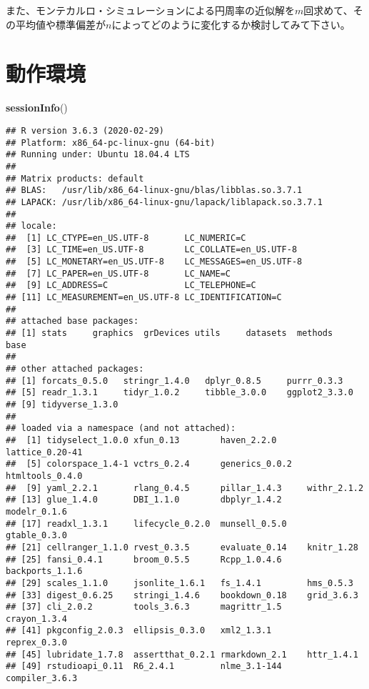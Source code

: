 \documentclass[]{bxjsarticle}
\newenvironment{Shaded}{\begin{snugshade}}{\end{snugshade}}
\newcommand{\KeywordTok}[1]{\textcolor[rgb]{0.13,0.29,0.53}{\textbf{#1}}}
\newcommand{\NormalTok}[1]{#1}
\begin{document}
また、モンテカルロ・シミュレーションによる円周率の近似解を\(m\)回求めて、その平均値や標準偏差が\(n\)によってどのように変化するか検討してみて下さい。

\hypertarget{environment}{%
\section*{動作環境}\label{environment}}

\begin{Shaded}
\begin{Highlighting}[]
\KeywordTok{sessionInfo}\NormalTok{()}
\end{Highlighting}
\end{Shaded}

\begin{verbatim}
## R version 3.6.3 (2020-02-29)
## Platform: x86_64-pc-linux-gnu (64-bit)
## Running under: Ubuntu 18.04.4 LTS
## 
## Matrix products: default
## BLAS:   /usr/lib/x86_64-linux-gnu/blas/libblas.so.3.7.1
## LAPACK: /usr/lib/x86_64-linux-gnu/lapack/liblapack.so.3.7.1
## 
## locale:
##  [1] LC_CTYPE=en_US.UTF-8       LC_NUMERIC=C              
##  [3] LC_TIME=en_US.UTF-8        LC_COLLATE=en_US.UTF-8    
##  [5] LC_MONETARY=en_US.UTF-8    LC_MESSAGES=en_US.UTF-8   
##  [7] LC_PAPER=en_US.UTF-8       LC_NAME=C                 
##  [9] LC_ADDRESS=C               LC_TELEPHONE=C            
## [11] LC_MEASUREMENT=en_US.UTF-8 LC_IDENTIFICATION=C       
## 
## attached base packages:
## [1] stats     graphics  grDevices utils     datasets  methods   base     
## 
## other attached packages:
## [1] forcats_0.5.0   stringr_1.4.0   dplyr_0.8.5     purrr_0.3.3    
## [5] readr_1.3.1     tidyr_1.0.2     tibble_3.0.0    ggplot2_3.3.0  
## [9] tidyverse_1.3.0
## 
## loaded via a namespace (and not attached):
##  [1] tidyselect_1.0.0 xfun_0.13        haven_2.2.0      lattice_0.20-41 
##  [5] colorspace_1.4-1 vctrs_0.2.4      generics_0.0.2   htmltools_0.4.0 
##  [9] yaml_2.2.1       rlang_0.4.5      pillar_1.4.3     withr_2.1.2     
## [13] glue_1.4.0       DBI_1.1.0        dbplyr_1.4.2     modelr_0.1.6    
## [17] readxl_1.3.1     lifecycle_0.2.0  munsell_0.5.0    gtable_0.3.0    
## [21] cellranger_1.1.0 rvest_0.3.5      evaluate_0.14    knitr_1.28      
## [25] fansi_0.4.1      broom_0.5.5      Rcpp_1.0.4.6     backports_1.1.6 
## [29] scales_1.1.0     jsonlite_1.6.1   fs_1.4.1         hms_0.5.3       
## [33] digest_0.6.25    stringi_1.4.6    bookdown_0.18    grid_3.6.3      
## [37] cli_2.0.2        tools_3.6.3      magrittr_1.5     crayon_1.3.4    
## [41] pkgconfig_2.0.3  ellipsis_0.3.0   xml2_1.3.1       reprex_0.3.0    
## [45] lubridate_1.7.8  assertthat_0.2.1 rmarkdown_2.1    httr_1.4.1      
## [49] rstudioapi_0.11  R6_2.4.1         nlme_3.1-144     compiler_3.6.3
\end{verbatim}


\end{document}
